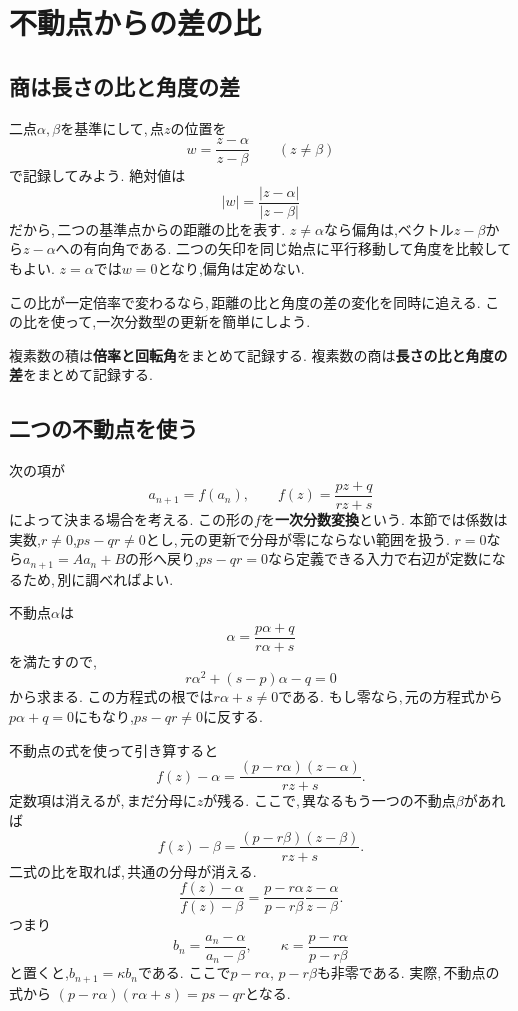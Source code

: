 \section{不動点からの差の比}\label{節：不動点からの差の比}
\subsection{商は長さの比と角度の差}

二点$\alpha,\beta$を基準にして,\,点$z$の位置を
\[
 w=\frac{z-\alpha}{z-\beta}\qquad(z\ne\beta)
\]
で記録してみよう.
絶対値は
\[
 |w|=\frac{|z-\alpha|}{|z-\beta|}
\]
だから,\,二つの基準点からの距離の比を表す.
$z\ne\alpha$なら偏角は,ベクトル$z-\beta$から$z-\alpha$への有向角である.
二つの矢印を同じ始点に平行移動して角度を比較してもよい.
$z=\alpha$では$w=0$となり,偏角は定めない.
\NewFigRatio

この比が一定倍率で変わるなら,\,距離の比と角度の差の変化を同時に追える.
この比を使って,一次分数型の更新を簡単にしよう.

\begin{bookpoint}
複素数の積は\textbf{倍率と回転角}をまとめて記録する.
複素数の商は\textbf{長さの比と角度の差}をまとめて記録する.
\end{bookpoint}

\subsection{二つの不動点を使う}

次の項が
\[
 a_{n+1}=f(a_n),\qquad
 f(z)=\frac{pz+q}{rz+s}
\]
によって決まる場合を考える.
この形の$f$を\textbf{一次分数変換}という.
本節では係数は実数,$r\ne0$,$ps-qr\ne0$とし,\,元の更新で分母が零にならない範囲を扱う.
$r=0$なら$a_{n+1}=Aa_n+B$の形へ戻り,$ps-qr=0$なら定義できる入力で右辺が定数になるため,\,別に調べればよい.

不動点$\alpha$は
\[
 \alpha=\frac{p\alpha+q}{r\alpha+s}
\]
を満たすので,
\[
 r\alpha^2+(s-p)\alpha-q=0
\]
から求まる.
この方程式の根では$r\alpha+s\ne0$である.
もし零なら,\,元の方程式から$p\alpha+q=0$にもなり,$ps-qr\ne0$に反する.

不動点の式を使って引き算すると
\[
 f(z)-\alpha
 =\frac{(p-r\alpha)(z-\alpha)}{rz+s}.
\]
定数項は消えるが,\,まだ分母に$z$が残る.
ここで,\,異なるもう一つの不動点$\beta$があれば
\[
 f(z)-\beta
 =\frac{(p-r\beta)(z-\beta)}{rz+s}.
\]
二式の比を取れば,\,共通の分母が消える.
\[
 \frac{f(z)-\alpha}{f(z)-\beta}
 =\frac{p-r\alpha}{p-r\beta}
  \frac{z-\alpha}{z-\beta}.
\]
つまり
\[
 b_n=\frac{a_n-\alpha}{a_n-\beta},\qquad
 \kappa=\frac{p-r\alpha}{p-r\beta}
\]
と置くと,$b_{n+1}=\kappa b_n$である.
ここで$p-r\alpha,\,p-r\beta$も非零である.
実際,\,不動点の式から
$(p-r\alpha)(r\alpha+s)=ps-qr$となる.

